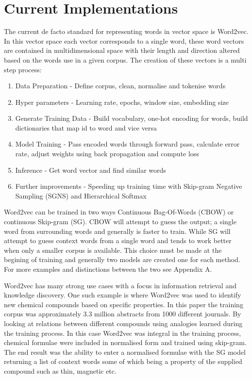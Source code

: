 \section{Current Implementations}
The current de facto standard for representing words in vector space is Word2vec. In this vector space each vector corresponds to a single word, these word vectors are contained in multidimensional space with their length and direction altered based on the words use in a given corpus. The creation of these vectors is a multi step process:
\begin{enumerate}
    \item Data Preparation - Define corpus, clean, normalise and tokenise words
    \item Hyper parameters - Learning rate, epochs, window size, embedding size
    \item Generate Training Data - Build vocabulary, one-hot encoding for words, build dictionaries that map id to word and vice versa
    \item Model Training - Pass encoded words through forward pass, calculate error rate, adjust weights using back propagation and compute loss
    \item Inference - Get word vector and find similar words
    \item Further improvements - Speeding up training time with Skip-gram Negative Sampling (SGNS) and Hierarchical Softmax
\end{enumerate}

\noindent
Word2vec can be trained in two ways Continuous Bag-Of-Words (CBOW) or continuous Skip-gram (SG). CBOW will attempt to guess the output; a single word from surrounding words and generally is faster to train. While SG will attempt to guess context words from a single word and tends to work better when only a smaller corpus is available. This choice must be made at the begining of training and generally two models are created one for each method. \cite{Mikolov} For more examples and distinctions between the two see Appendix A.

Word2vec has many strong use cases with a focus in information retrieval and knowledge discovery. One such example is where Word2vec was used to identify new chemical compounds based on specific properties. In this paper the training corpus was approximately 3.3 million abstracts from 1000 different journals. By looking at relations between different compounds using analogies learned during the training process. In this case Word2vec was integral in the training process, chemical formulae were included in normalised form and trained using skip-gram. The end result was the ability to enter a normalised formulae with the SG model returning a list of context words some of which being a property of the supplied compound such as thin, magnetic etc. \cite{Tshitoyan}

